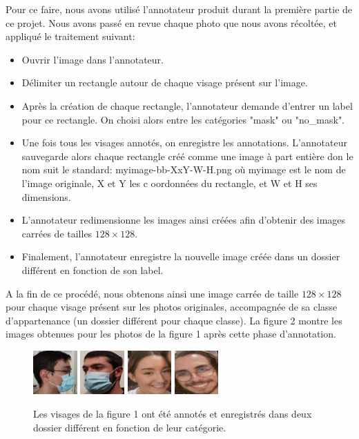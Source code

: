 \documentclass{article}
\begin{document}
Pour ce faire, nous avons utilisé l'annotateur produit durant la première partie de ce projet. Nous avons passé en revue chaque photo que nous avons récoltée, et appliqué le traitement suivant:
\begin{itemize}
  \item Ouvrir l'image dans l'annotateur.
  \item Délimiter un rectangle autour de chaque visage présent sur l'image.
  \item Après la création de chaque rectangle, l'annotateur demande d'entrer un label pour ce rectangle. On choisi alors entre les catégories "mask" ou "no\_mask".
  \item Une fois tous les visages annotés, on enregistre les annotations. L'annotateur sauvegarde alors chaque rectangle créé comme une image à part entière don le nom suit le standard: myimage-bb-XxY-W-H.png où myimage est le nom de l'image originale, X et Y les c oordonnées du rectangle, et W et H ses dimensions.
  \item L'annotateur redimensionne les images ainsi créées afin d'obtenir des images carrées de tailles $128\times128$.
  \item Finalement, l'annotateur enregistre la nouvelle image créée dans un dossier différent en fonction de son label.\\
\end{itemize}

A la fin de ce procédé, nous obtenons ainsi une image carrée de taille $128\times128$ pour chaque visage présent sur les photos originales, accompagnée de sa classe d'appartenance (un dossier différent pour chaque classe). La figure 2 montre les images obtenues pour les photos de la figure 1 après cette phase d'annotation.
\begin{figure}[h]
\centering
\includegraphics[width=0.15\textwidth]{annotated2.png}
\includegraphics[width=0.15\textwidth]{annotated1.png}
\includegraphics[width=0.15\textwidth]{annotated4.png}
\includegraphics[width=0.15\textwidth]{annotated3.png}
\caption{\label{fig:Input}Les visages de la figure 1 ont été annotés et enregistrés dans deux dossier différent en fonction de leur catégorie.\\}
\end{figure}
\end{document}
